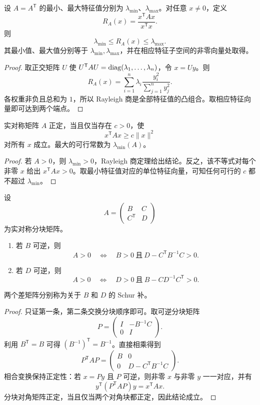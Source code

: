 \begin{theorem}
设 $A=A^{\mathsf T}$ 的最小、最大特征值分别为 $\lambda_{\min}$、$\lambda_{\max}$。对任意 $x\ne0$，定义
\[
R_A(x)=\frac{x^{\mathsf T}Ax}{x^{\mathsf T}x}.
\]
则
\[
\lambda_{\min}\le R_A(x)\le\lambda_{\max}.
\]
其最小值、最大值分别等于 $\lambda_{\min},\lambda_{\max}$，并在相应特征子空间的非零向量处取得。
\end{theorem}
\begin{proof}
取正交矩阵 $U$ 使 $U^{\mathsf T}AU=\operatorname{diag}(\lambda_1,\ldots,\lambda_n)$，令 $x=Uy$。则
\[
R_A(x)
=\sum_{i=1}^n\lambda_i
\frac{y_i^2}{\sum_{j=1}^n y_j^2}.
\]
各权重非负且总和为 $1$，所以 Rayleigh 商是全部特征值的凸组合。取相应特征向量即可达到两个端点。
\end{proof}

\begin{corollary}[正定性的统一下界]
实对称矩阵 $A$ 正定，当且仅当存在 $c>0$，使
\[
x^{\mathsf T}Ax\ge c\lVert x\rVert^2
\]
对所有 $x$ 成立。最大的可行常数为 $\lambda_{\min}(A)$。
\end{corollary}
\begin{proof}
若 $A>0$，则 $\lambda_{\min}>0$，Rayleigh 商定理给出结论。反之，该不等式对每个非零 $x$ 给出 $x^{\mathsf T}Ax>0$。取最小特征值对应的单位特征向量，可知任何可行的 $c$ 都不超过 $\lambda_{\min}$。
\end{proof}

\begin{theorem}
设
\[
A=\begin{pmatrix}B&C\\C^{\mathsf T}&D\end{pmatrix}
\]
为实对称分块矩阵。
\begin{enumerate}
\item 若 $B$ 可逆，则
\[
A>0
\quad\Longleftrightarrow\quad
B>0\ \text{且}\ D-C^{\mathsf T}B^{-1}C>0.
\]
\item 若 $D$ 可逆，则
\[
A>0
\quad\Longleftrightarrow\quad
D>0\ \text{且}\ B-CD^{-1}C^{\mathsf T}>0.
\]
\end{enumerate}
两个差矩阵分别称为关于 $B$ 和 $D$ 的 Schur 补。
\end{theorem}
\begin{proof}
只证第一条，第二条交换分块顺序即可。取可逆分块矩阵
\[
P=\begin{pmatrix}I&-B^{-1}C\\0&I\end{pmatrix}.
\]
利用 $B^{\mathsf T}=B$ 可得 $(B^{-1})^{\mathsf T}=B^{-1}$。直接相乘得到
\[
P^{\mathsf T}AP=
\begin{pmatrix}
B&0\\
0&D-C^{\mathsf T}B^{-1}C
\end{pmatrix}.
\]
相合变换保持正定性：若 $x=Py$ 且 $P$ 可逆，则非零 $x$ 与非零 $y$ 一一对应，并有
\[
y^{\mathsf T}(P^{\mathsf T}AP)y=x^{\mathsf T}Ax.
\]
分块对角矩阵正定，当且仅当两个对角块都正定，因此结论成立。
\end{proof}

